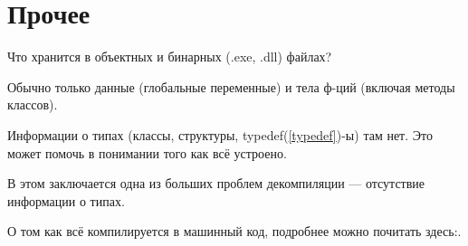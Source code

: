 ﻿\chapter{Прочее}

Что хранится в объектных и бинарных (.exe, .dll) файлах?

Обычно только данные (глобальные переменные) и тела ф-ций (включая методы классов).

Информации о типах (классы, структуры, typedef(\ref{typedef})-ы) там нет. 
Это может помочь в понимании того как всё устроено.

В этом заключается одна из больших проблем декомпиляции --- отсутствие информации о типах.


О том как всё компилируется в машинный код, подробнее можно почитать здесь:\cite{REBook}.








